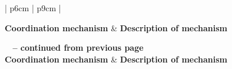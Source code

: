\begin{center}
    \begin{longtable}{| p{6cm} | p{9cm} |}

    \hline \textbf{Coordination mechanism} & \textbf{Description of mechanism} \\ \hline
    \endfirsthead

{{\bfseries \tablename\ \thetable{} -- continued from previous page}} \\ \hline
    \textbf{Coordination mechanism} & \textbf{Description of mechanism} \\ \hline
    \endhead

     \\ \hline
    \endfoot

   \endlastfoot


\end{longtable}
\end{center}
